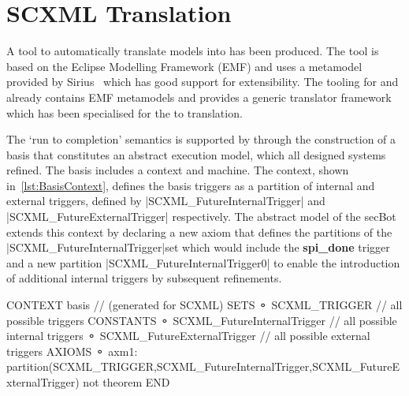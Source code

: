 \section{SCXML Translation}
\label{sec:translation}

A tool to automatically translate \SCXML models into \iUMLB has been produced. 
The tool is based on the Eclipse Modelling Framework (EMF) and uses a \SCXML metamodel provided by Sirius~\cite{siriuswebsite} which has good support for extensibility. 
The tooling for \iUMLB and \EventB already contains EMF metamodels and provides a generic translator framework which has been specialised for the \SCXML to \iUMLB translation. 

The `run to completion' semantics is supported by \EventB through the construction of a basis that constitutes an 
abstract execution model, which all designed systems refined. The basis includes a \EventB context and machine. 
The context, shown in~\ref{lst:BasisContext}, defines the basis triggers as a partition of internal and external triggers, defined by |SCXML_FutureInternalTrigger| and |SCXML_FutureExternalTrigger| respectively. The abstract model of the secBot extends this context by declaring a new axiom that defines the partitions of the |SCXML_FutureInternalTrigger|set which would include the \textbf{spi\_done} trigger and a new partition |SCXML_FutureInternalTrigger0| to enable the introduction of additional internal triggers by subsequent refinements. 

\begin{EventBcode} 
	CONTEXT
		basis 	// (generated for SCXML)
	SETS
	⚬	SCXML_TRIGGER	 // all possible triggers
	CONSTANTS
	⚬	SCXML_FutureInternalTrigger	 // all possible internal triggers
	⚬	SCXML_FutureExternalTrigger	 // all possible external triggers
	AXIOMS
	⚬	axm1:	partition(SCXML_TRIGGER,SCXML_FutureInternalTrigger,SCXML_FutureExternalTrigger) not theorem 
	END
\end{EventBcode}

